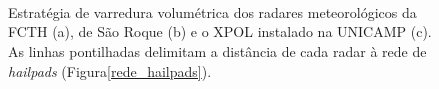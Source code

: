 \begin{figure}[hp]
	\begin{center}
		\caption{Estratégia de varredura volumétrica dos radares meteorológicos da FCTH (a), de São Roque (b) e o XPOL instalado na UNICAMP (c). As linhas pontilhadas delimitam a distância de cada radar à rede de \textit{hailpads} (Figura\autoref{rede_hailpads}).} 
		\label{estrategia_radares}
		\\
		\\
		\\
	\end{center}
\end{figure}

